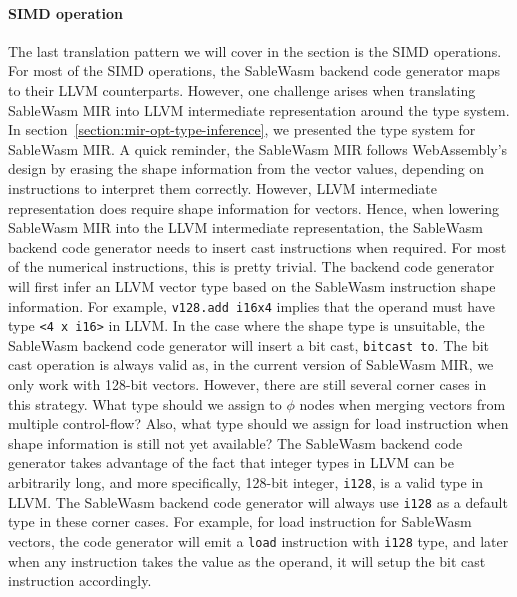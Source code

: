 \paragraph{SIMD operation}
The last translation pattern we will cover in the section is the SIMD
operations. For most of the SIMD operations, the SableWasm backend code
generator maps to their LLVM counterparts. However, one challenge arises when
translating SableWasm MIR into LLVM intermediate representation around the
type system. In section~\ref{section:mir-opt-type-inference}, we presented the
type system for SableWasm MIR.
A quick reminder, the SableWasm MIR follows WebAssembly's design by erasing the
shape information from the vector values, depending on instructions to
interpret them correctly. However, LLVM intermediate representation does
require shape information for vectors. Hence, when lowering SableWasm MIR into
the LLVM intermediate representation, the SableWasm backend code generator needs
to insert cast instructions when required. For most of the numerical
instructions, this is pretty trivial. The backend code generator will first
infer an LLVM vector type based on the SableWasm instruction shape information.
For example, \texttt{v128.add i16x4} implies that the operand must have type
\texttt{<4 x i16>} in LLVM. In the case where the shape type is unsuitable,
the SableWasm backend code generator will insert a bit cast,
\texttt{bitcast to}. The bit cast operation is always valid as, in the current
version of SableWasm MIR, we only work with 128-bit vectors. However, there
are still several corner cases in this strategy. What type should we assign to
$\phi$ nodes when merging vectors from multiple control-flow? Also, what type
should we assign for load instruction when shape information is still not yet
available? The SableWasm backend code generator takes advantage of the fact
that integer types in LLVM can be arbitrarily long, and more specifically,
128-bit integer, \texttt{i128}, is a valid type in LLVM. The SableWasm backend
code generator will always use \texttt{i128} as a default type in these corner
cases. For example, for load instruction for SableWasm vectors, the code
generator will emit a \texttt{load} instruction with \texttt{i128} type, and
later when any instruction takes the value as the operand, it will setup the
bit cast instruction accordingly.